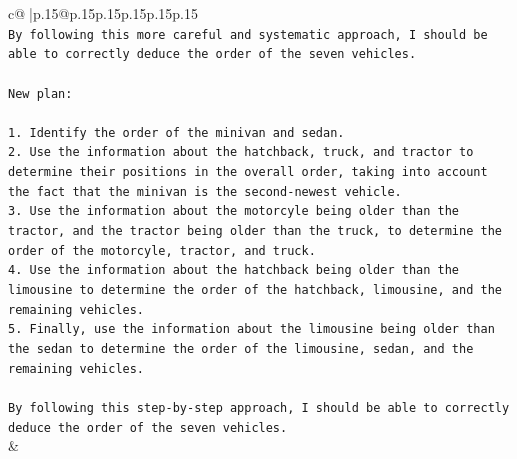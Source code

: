 \documentclass{article}
\begin{document}
{\begin{supertabular}{c@{$\;$}|p{.15\linewidth}@{}p{.15\linewidth}p{.15\linewidth}p{.15\linewidth}p{.15\linewidth}p{.15\linewidth}}
{{{\\ 
\texttt{By following this more careful and systematic approach, I should be able to correctly deduce the order of the seven vehicles.} \\
\\ 
\texttt{New plan: } \\
\\ 
\texttt{1. Identify the order of the minivan and sedan.} \\
\texttt{2. Use the information about the hatchback, truck, and tractor to determine their positions in the overall order, taking into account the fact that the minivan is the second{-}newest vehicle.} \\
\texttt{3. Use the information about the motorcyle being older than the tractor, and the tractor being older than the truck, to determine the order of the motorcyle, tractor, and truck.} \\
\texttt{4. Use the information about the hatchback being older than the limousine to determine the order of the hatchback, limousine, and the remaining vehicles.} \\
\texttt{5. Finally, use the information about the limousine being older than the sedan to determine the order of the limousine, sedan, and the remaining vehicles.} \\
\\ 
\texttt{By following this step{-}by{-}step approach, I should be able to correctly deduce the order of the seven vehicles.} \\
            }
        }
    }
    & \\ \\

\end{supertabular}
}
\end{document}
